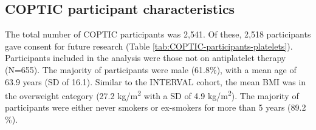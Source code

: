 \documentclass[11pt,twoside]{bristolthesis}
\begin{document}
\hypertarget{coptic-participant-characteristics}{%
\subsection{COPTIC participant characteristics}\label{coptic-participant-characteristics}}

The total number of COPTIC participants was 2,541. Of these, 2,518 participants gave consent for future research (Table \ref{tab:COPTIC-participants-platelets}). Participants included in the analysis were those not on antiplatelet therapy (N=655). The majority of participants were male (61.8\%), with a mean age of 63.9 years (SD of 16.1). Similar to the INTERVAL cohort, the mean BMI was in the overweight category (27.2 kg/m\textsuperscript{2} with a SD of 4.9 kg/m\textsuperscript{2}). The majority of participants were either never smokers or ex-smokers for more than 5 years (89.2 \%).
\end{document}
